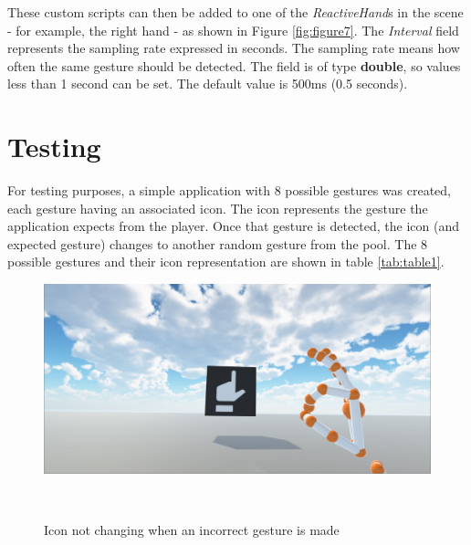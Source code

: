 \documentclass{sigchi}
\begin{document}
These custom scripts can then be added to one of the \textit{ReactiveHand}s in the scene - for example, the right hand - as shown in Figure \ref{fig:figure7}. The \textit{Interval} field represents the sampling rate expressed in seconds. The sampling rate means how often the same gesture should be detected. The field is of type \textbf{double}, so values less than 1 second can be set. The default value is 500ms (0.5 seconds).

\section{Testing}

For testing purposes, a simple application with 8 possible gestures was created, each gesture having an associated icon. The icon represents the gesture the application expects from the player. Once that gesture is detected, the icon (and expected gesture) changes to another random gesture from the pool. The 8 possible gestures and their icon representation are shown in table \ref{tab:table1}.

\begin{figure}[h]
  \centering
  \includegraphics[width=0.9\columnwidth]{figures/Demo_not_detected.jpg}
  \caption{Icon not changing when an incorrect gesture is made}~\label{fig:figure12}
\end{figure}
\end{document}
